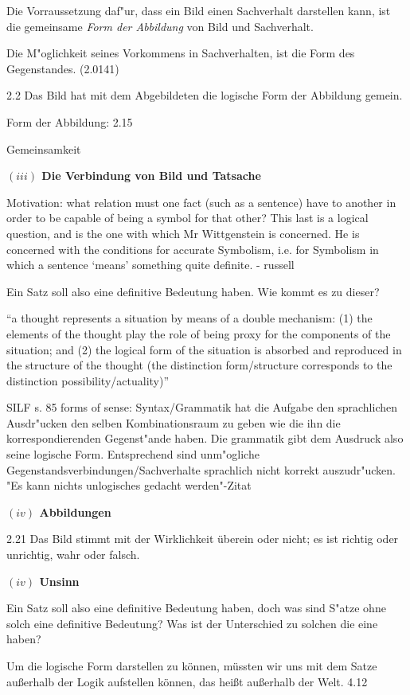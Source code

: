 \documentclass[a4paper, emulatestandardclasses, 12pt]{scrartcl}
\begin{document}
\begin{onehalfspace}
Die Vorraussetzung daf"ur, dass ein Bild einen Sachverhalt darstellen kann, ist die gemeinsame \emph{Form der Abbildung} von Bild und Sachverhalt. 


Die M"oglichkeit seines Vorkommens in Sachverhalten, ist die Form des Gegenstandes. (2.0141)

2.2
Das Bild hat mit dem Abgebildeten die logische Form der Abbildung gemein.

Form der Abbildung: 2.15

Gemeinsamkeit

\vspace{5mm}
\noindent\textbf{$(iii)$ Die Verbindung von Bild und Tatsache}	

\noindent Motivation: what relation must one fact (such as a sentence) have to another in order to be capable of being a symbol for that other? This last is a logical question, and is the one with which Mr Wittgenstein is concerned. He is concerned with the conditions for accurate Symbolism, i.e. for Symbolism in which a sentence `means' something quite definite. - russell

Ein Satz soll also eine definitive Bedeutung haben. Wie kommt es zu dieser? 

\noindent "`a thought represents a situation by means of a double mechanism: (1) the elements of the thought play the role of being proxy for the components of the situation; and (2) the logical form of the situation is absorbed and reproduced in the structure of the thought (the distinction form/structure corresponds to the distinction possibility/actuality)"' \cite[S.46]{frascolla2007understanding}

SILF s. 85 forms of sense: Syntax/Grammatik hat die Aufgabe den sprachlichen Ausdr"ucken den selben Kombinationsraum zu geben wie die ihn die korrespondierenden Gegenst"ande haben. Die grammatik gibt dem Ausdruck also seine logische Form. Entsprechend sind unm"ogliche Gegenstandsverbindungen/Sachverhalte sprachlich nicht korrekt auszudr"ucken. "Es kann nichts unlogisches gedacht werden"-Zitat


\vspace{5mm}
\noindent\textbf{$(iv)$ Abbildungen}	

2.21
Das Bild stimmt mit der Wirklichkeit überein oder nicht; es ist richtig oder unrichtig, wahr oder falsch.

\vspace{5mm}
\noindent\textbf{$(iv)$ Unsinn}	

Ein Satz soll also eine definitive Bedeutung haben, doch was sind S"atze ohne solch eine definitive Bedeutung? Was ist der Unterschied zu solchen die eine haben?

Um die logische Form darstellen zu können, müssten wir uns mit dem Satze außerhalb der Logik aufstellen können, das heißt außerhalb der Welt. 4.12


\end{onehalfspace}
\nocite{*}

\end{document}
